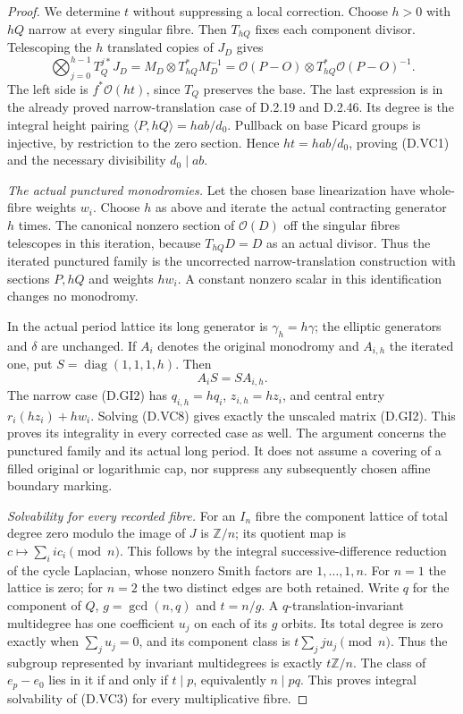 \begin{proof}
We determine $t$ without suppressing a local correction.
Choose $h>0$ with $hQ$ narrow at every singular fibre.
Then $T_{hQ}$ fixes each component divisor. Telescoping
the $h$ translated copies of $J_D$ gives
\[
 \bigotimes_{j=0}^{h-1} T_Q^{j*}J_D
       =M_D\otimes T_{hQ}^*M_D^{-1}
       =\mathcal O(P-O)\otimes
                    T_{hQ}^*\mathcal O(P-O)^{-1}.          \tag{D.VC5}
\]
The left side is $f^*\mathcal O(ht)$, since $T_Q$ preserves
the base. The last expression is in the already proved
narrow-translation case of D.2.19 and D.2.46. Its degree
is the integral height pairing
$\langle P,hQ\rangle=hab/d_0$.
Pullback on base Picard groups is injective, by restriction
to the zero section. Hence $ht=hab/d_0$, proving (D.VC1)
and the necessary divisibility $d_0\mid ab$.


\emph{The actual punctured monodromies.}
Let the chosen base linearization have whole-fibre weights $w_i$.
Choose $h$ as above and iterate the actual contracting generator
$h$ times. The canonical nonzero section of $\mathcal O(D)$
off the singular fibres telescopes in this iteration, because
$T_{hQ}D=D$ as an actual divisor. Thus the iterated punctured
family is the uncorrected narrow-translation construction with
sections $P,hQ$ and weights $h w_i$. A constant nonzero scalar
in this identification changes no monodromy.

In the actual period lattice its long generator is
$\gamma_h=h\gamma$; the elliptic generators and $\delta$ are
unchanged. If $A_i$ denotes the original monodromy and $A_{i,h}$
the iterated one, put $S=\operatorname{diag}(1,1,1,h)$. Then
\[
                         A_iS=SA_{i,h}.                    \tag{D.VC8}
\]
The narrow case (D.GI2) has $q_{i,h}=h q_i$,
$z_{i,h}=h z_i$, and central entry $r_i(hz_i)+h w_i$.
Solving (D.VC8) gives exactly the unscaled matrix (D.GI2).
This proves its integrality in every corrected case as well.
The argument concerns the punctured family and its actual long
period. It does not assume a covering of a filled original or
logarithmic cap, nor suppress any subsequently chosen affine
boundary marking.

\emph{Solvability for every recorded fibre.}
For an $I_n$ fibre the component lattice of total degree
zero modulo the image of $J$ is $\mathbb Z/n$; its quotient
map is $c\mapsto\sum_i i c_i\pmod n$.
This follows by the integral successive-difference reduction
of the cycle Laplacian, whose nonzero Smith factors are
$1,\ldots,1,n$. For $n=1$ the lattice is zero; for $n=2$
the two distinct edges are both retained.
Write $q$ for the component of $Q$, $g=\gcd(n,q)$ and
$t=n/g$. A $q$-translation-invariant multidegree has one
coefficient $u_j$ on each of its $g$ orbits. Its total degree
is zero exactly when $\sum_j u_j=0$, and its component
class is $t\sum_j j u_j\pmod n$.
Thus the subgroup represented by invariant multidegrees
is exactly $t\mathbb Z/n$. The class of $e_p-e_0$ lies in it
if and only if $t\mid p$, equivalently $n\mid pq$.
This proves integral solvability of (D.VC3) for every
multiplicative fibre.


\end{proof}
